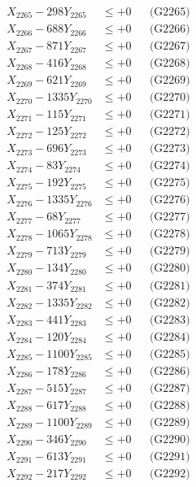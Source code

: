 \documentclass[a4paper,10pt]{article}
\begin{document}
{\begin{align}
X_{2265} - 298Y_{2265} &\leq +0 && \text{(G2265)} \\
X_{2266} - 688Y_{2266} &\leq +0 && \text{(G2266)} \\
X_{2267} - 871Y_{2267} &\leq +0 && \text{(G2267)} \\
X_{2268} - 416Y_{2268} &\leq +0 && \text{(G2268)} \\
X_{2269} - 621Y_{2269} &\leq +0 && \text{(G2269)} \\
X_{2270} - 1335Y_{2270} &\leq +0 && \text{(G2270)} \\
\allowbreak
X_{2271} - 115Y_{2271} &\leq +0 && \text{(G2271)} \\
X_{2272} - 125Y_{2272} &\leq +0 && \text{(G2272)} \\
X_{2273} - 696Y_{2273} &\leq +0 && \text{(G2273)} \\
X_{2274} - 83Y_{2274} &\leq +0 && \text{(G2274)} \\
X_{2275} - 192Y_{2275} &\leq +0 && \text{(G2275)} \\
X_{2276} - 1335Y_{2276} &\leq +0 && \text{(G2276)} \\
X_{2277} - 68Y_{2277} &\leq +0 && \text{(G2277)} \\
X_{2278} - 1065Y_{2278} &\leq +0 && \text{(G2278)} \\
X_{2279} - 713Y_{2279} &\leq +0 && \text{(G2279)} \\
X_{2280} - 134Y_{2280} &\leq +0 && \text{(G2280)} \\
\allowbreak
X_{2281} - 374Y_{2281} &\leq +0 && \text{(G2281)} \\
X_{2282} - 1335Y_{2282} &\leq +0 && \text{(G2282)} \\
X_{2283} - 441Y_{2283} &\leq +0 && \text{(G2283)} \\
X_{2284} - 120Y_{2284} &\leq +0 && \text{(G2284)} \\
X_{2285} - 1100Y_{2285} &\leq +0 && \text{(G2285)} \\
X_{2286} - 178Y_{2286} &\leq +0 && \text{(G2286)} \\
X_{2287} - 515Y_{2287} &\leq +0 && \text{(G2287)} \\
X_{2288} - 617Y_{2288} &\leq +0 && \text{(G2288)} \\
X_{2289} - 1100Y_{2289} &\leq +0 && \text{(G2289)} \\
X_{2290} - 346Y_{2290} &\leq +0 && \text{(G2290)} \\
\allowbreak
X_{2291} - 613Y_{2291} &\leq +0 && \text{(G2291)} \\
X_{2292} - 217Y_{2292} &\leq +0 && \text{(G2292)} \\

\end{align}}
\end{document}

